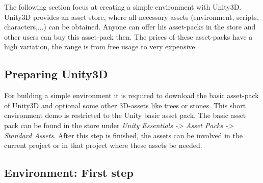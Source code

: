 \documentclass[conference]{IEEEtran}
\begin{document}
The following section focus at creating a simple environment with Unity3D. 
Unity3D provides an asset store, where all necessary assets (environment, scripts, characters,...) can be obtained. Anyone can offer his asset-packs in the store and other users can buy this asset-pack then. The prices of these asset-packs have a high variation, the range is from free usage to very expensive. 

\subsection{Preparing Unity3D}

For building a simple environment it is required to download the basic asset-pack of Unity3D and optional some other 3D-assets like trees or stones. This short environment demo is restricted to the Unity basic asset pack. The basic asset pack can be found in the store under \emph{Unity Essentials -> Asset Packs -> Standard Assets}.
After this step is finished, the assets can be involved in the current project or in that project where these assets be needed.

 
\subsection{Environment: First step}
\end{document}
